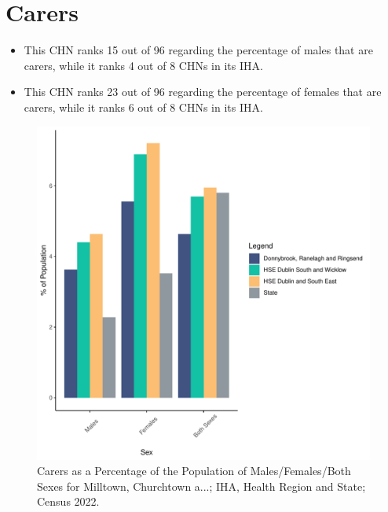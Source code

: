 \documentclass{article}
\begin{document}
\section{Carers}\label{sect:Carers}
\begin{itemize}
\item This CHN ranks  15 out of 96 regarding the percentage of males that are carers, while it ranks   4 out of 8 CHNs in its IHA.
\item This CHN ranks  23 out of 96 regarding the percentage of females that are carers, while it ranks   6 out of 8 CHNs in its IHA.
\end{itemize}
\begin{figure}[H]
	\centering
	\includegraphics[width = 150mm]{../figures/CareED.pdf}
	\caption{Carers as a Percentage of the Population of Males/Females/Both Sexes for Milltown, Churchtown a...; IHA, Health Region and State; Census 2022.}
	\label{fig:2ae19629-1a6a-13a3-e055-000000000001}
	\end{figure}
\end{document}
